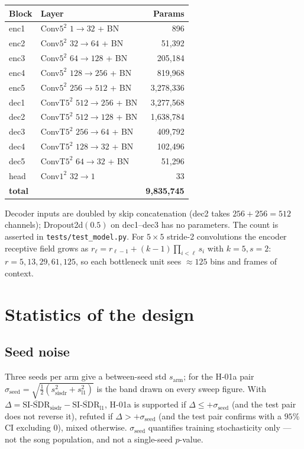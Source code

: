 \documentclass[11pt]{article}
\newcommand{\code}[1]{\texttt{#1}}
\begin{document}
\begin{center}
\begin{tabular}{llr}
\hline
Block & Layer & Params \\
\hline
enc1 & Conv$5^2$ $1\!\to\!32$ + BN   & 896 \\
enc2 & Conv$5^2$ $32\!\to\!64$ + BN  & 51{,}392 \\
enc3 & Conv$5^2$ $64\!\to\!128$ + BN & 205{,}184 \\
enc4 & Conv$5^2$ $128\!\to\!256$ + BN& 819{,}968 \\
enc5 & Conv$5^2$ $256\!\to\!512$ + BN& 3{,}278{,}336 \\
dec1 & ConvT$5^2$ $512\!\to\!256$ + BN& 3{,}277{,}568 \\
dec2 & ConvT$5^2$ $512\!\to\!128$ + BN& 1{,}638{,}784 \\
dec3 & ConvT$5^2$ $256\!\to\!64$ + BN & 409{,}792 \\
dec4 & ConvT$5^2$ $128\!\to\!32$ + BN & 102{,}496 \\
dec5 & ConvT$5^2$ $64\!\to\!32$ + BN  & 51{,}296 \\
head & Conv$1^2$ $32\!\to\!1$         & 33 \\
\hline
\textbf{total} & & \textbf{9{,}835{,}745} \\
\hline
\end{tabular}
\end{center}

Decoder inputs are doubled by skip concatenation (dec2 takes $256+256=512$
channels); Dropout2d$(0.5)$ on dec1--dec3 has no parameters. The count is
asserted in \code{tests/test\_model.py}. For $5\times5$ stride-2 convolutions the
encoder receptive field grows as $r_\ell=r_{\ell-1}+(k-1)\prod_{i<\ell}s_i$ with
$k=5,s=2$: $r=5,13,29,61,125$, so each bottleneck unit sees $\approx125$ bins and
frames of context.

\section{Statistics of the design}

\subsection{Seed noise}
Three seeds per arm give a between-seed std $s_{\mathrm{arm}}$; for the H-01a pair
$\sigma_{\mathrm{seed}}=\sqrt{\tfrac12(s^2_{\mathrm{sisdr}}+s^2_{\mathrm{l1}})}$
is the band drawn on every sweep figure. With
$\Delta=\overline{\text{SI-SDR}}_{\mathrm{sisdr}}-\overline{\text{SI-SDR}}_{\mathrm{l1}}$,
H-01a is supported if $\Delta\le+\sigma_{\mathrm{seed}}$ (and the test pair does
not reverse it), refuted if $\Delta>+\sigma_{\mathrm{seed}}$ (and the test pair
confirms with a $95\%$ CI excluding $0$), mixed otherwise.
$\sigma_{\mathrm{seed}}$ quantifies training stochasticity only --- not the
song population, and not a single-seed $p$-value.
\end{document}
